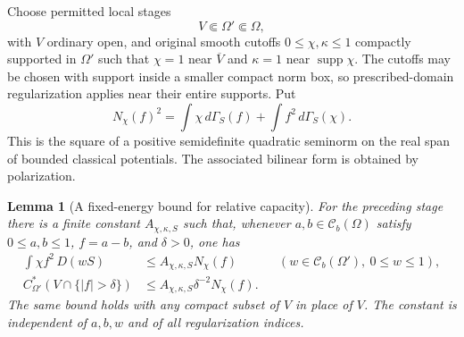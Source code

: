 \documentclass[11pt,a4paper]{article}
\numberwithin{equation}{section}
\newtheorem{lemma}[theorem]{Lemma}
\theoremstyle{definition}
\theoremstyle{remark}
\newcommand{\Cb}{\mathcal C_b}
\begin{document}
Choose permitted local stages
\[
 V\Subset\Omega'\Subset\Omega,
\]
with $V$ ordinary open, and original smooth cutoffs
$0\leq\chi,\kappa\leq1$ compactly supported in $\Omega'$ such
that $\chi=1$ near $\overline V$ and $\kappa=1$ near
$\operatorname{supp}\chi$. The cutoffs may be chosen with support
inside a smaller compact norm box, so prescribed-domain
regularization applies near their entire supports. Put
\begin{equation}
\label{eq:r3-cutoff-energy-norm}
 N_\chi(f)^2
    =\int\chi\,d\Gamma_S(f)
       +\int f^2\,d\Gamma_S(\chi).
\end{equation}
This is the square of a positive semidefinite quadratic seminorm
on the real span of bounded classical potentials. The associated
bilinear form is obtained by polarization.

\begin{lemma}[A fixed-energy bound for relative capacity]
\label{lem:r3-linear-energy-capacity}
For the preceding stage there is a finite constant $A_{\chi,\kappa,S}$
such that, whenever $a,b\in\Cb(\Omega)$ satisfy $0\leq a,b\leq1$,
$f=a-b$, and $\delta>0$, one has
\begin{align}
 \int\chi f^2\,D(wS)
   &\leq A_{\chi,\kappa,S} N_\chi(f)
       &&(w\in\Cb(\Omega'),\ 0\leq w\leq1),
       \label{eq:r3-energy-square-bound}\\
 C_{\Omega'}^*(V\cap\{|f|>\delta\})
   &\leq A_{\chi,\kappa,S}\delta^{-2}N_\chi(f).
       \label{eq:r3-energy-capacity-bound}
\end{align}
The same bound holds with any compact subset of $V$ in place of
$V$. The constant is independent of $a,b,w$ and of all
regularization indices.
\end{lemma}
\end{document}
